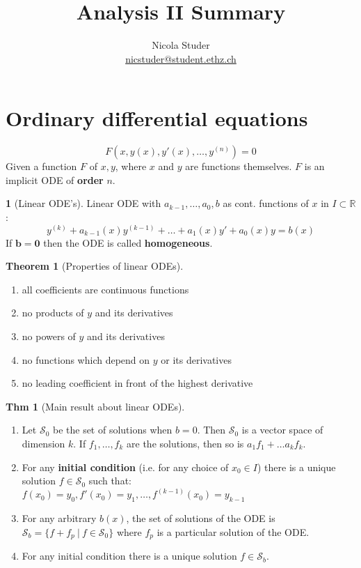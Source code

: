 \documentclass[a4paper, 10pt]{article}
\title{Analysis II Summary}
\author{Nicola Studer \\ \href{mailto:nicstuder@student.ethz.ch}{nicstuder@student.ethz.ch}}
\date{\vspace{-5ex}}
\theoremstyle{definition}
\newtheorem*{theorem}{Thm}
\theoremstyle{colored}
\newtheorem*{note_wrapper}{}
\theoremstyle{ex}
\theoremstyle{named}
\newtheorem*{ntheorem_wrapper}{Theorem}
\newenvironment{ntheorem}%
    {\begin{mdframed}[style=important]\begin{ntheorem_wrapper}}%
    {\end{ntheorem_wrapper}\end{mdframed}}
\newenvironment{note}%
    {\begin{mdframed}[style=trick]\begin{note_wrapper}}%
    {\end{note_wrapper}\end{mdframed}}
\newcommand{\R}{\mathbb{R}}
\begin{document}
\maketitle

\section{Ordinary differential equations}
\[F(x, y(x), y'(x), \ldots, y^{(n)}) = 0\]
Given a function \(F\) of \(x, y\), where \(x\) and \(y\) are functions themselves. \(F\) is an implicit ODE of \textbf{order} \(n\).

\begin{note}[Linear ODE's]
    Linear ODE with \(a_{k-1}, \ldots, a_0, b\) as cont. functions of \(x\) in \(I \subset \R\):
    \[y^{(k)} + a_{k-1}(x)y^{(k-1)} + \ldots + a_1(x)y' + a_0(x)y = b(x)\]
    If \(\bm{b = 0}\) then the ODE is called \textbf{homogeneous}.
\end{note}

\begin{ntheorem}[Properties of linear ODEs]
    \(\;\)
    \begin{enumerate}
        \item all coefficients are continuous functions
        \item no products of \(y\) and its derivatives
        \item no powers of \(y\) and its derivatives
        \item no functions which depend on \(y\) or its derivatives
        \item no leading coefficient in front of the highest derivative
    \end{enumerate}
\end{ntheorem}

\begin{theorem}[Main result about linear ODEs]
    \(\;\)
    \begin{enumerate}
        \item Let \(\mathcal{S}_0\) be the set of solutions when \(b = 0\). Then \(\mathcal{S}_0\) is a vector space of dimension \(k\). If \(f_1, \ldots, f_k\) are the solutions, then so is \(a_1f_1+ \ldots a_kf_k\).
        \item For any \textbf{initial condition} (i.e. for any choice of \(x_0 \in I\)) there is a unique solution \(f \in \mathcal{S}_0\) such that: \\
        \(f(x_0) = y_0, f'(x_0) = y_1, \ldots, f^{(k-1)}(x_0) = y_{k-1}\)
        \item For any arbitrary \(b(x)\), the set of solutions of the ODE is \(\mathcal{S}_b = \{f + f_p \ | \ f \in \mathcal{S}_0\}\) where \(f_p\) is a particular solution of the ODE.
        \item For any initial condition there is a unique solution \(f \in \mathcal{S}_b\).
    \end{enumerate}
\end{theorem}
\end{document}
